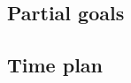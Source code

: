 \documentclass[a4paper,11pt]{article}
\begin{document}
\subsection*{Partial goals}
\subsection*{Time plan}


\begin{comment}
\section*{Background}
PV (photovoltaic) systems are collections of solar panels connected to power
inverters, a product which transforms the DC power from solar panels to the grid (AC power).
Optistring is a startup building digital inverters which are capable of achieving
better efficiency than traditional systems.
Part of the existing product is a stream of data containing measurements from all
solar panels in the system, making analysis of the system in various aspects possible.

The purpose of this Master's thesis project is to build a software solution which
is capable of detecting failures in PV systems.
Part of this involves formulating the different kind of failures that may occur,
developing a solution, and research of how failures should be presented.

\section*{Scientific question}

\subsubsection*{The problem}
Two different kinds of failure conditions in solar panels are relevant: instantaneous power loss due to faulty solar panels, and gradual power degradation over time.
The problem is how to detect these efficiently in the presence of different system configurations, but also geographic and thermal dependencies (all systems deliver different power curves). 

\subsubsection*{Previous work}
The company itself is a startup founded on research in power electronics, and does in some ways present a unique opportunity in performing this failure detection.
One benefit of this system is real-time data from individual solar panels with several sources of information.
It is of interest to detect failures since otherwise manual inspection is required and more fine-grained power degradation might not be easily detectable.


\end{comment}
\end{document}
